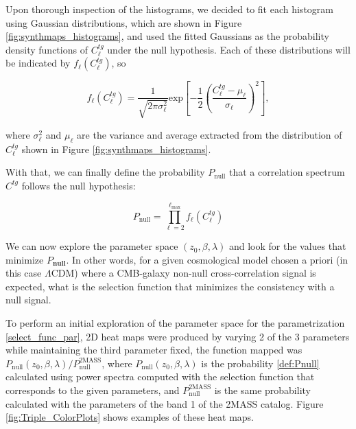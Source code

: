 \documentclass[openany,a4paper,12pt,oneside]{book}
\begin{document}
\begin{spacing}{1.5}
Upon thorough inspection of the histograms, we decided to fit each histogram using Gaussian distributions, which are shown in Figure \ref{fig:synthmaps_histograms}, and used the fitted Gaussians as the probability density functions of $C^{tg}_{\ell}$ under the null hypothesis. Each of these distributions will be indicated by $f_\ell\left(C^{tg}_\ell\right)$, so

\begin{equation}\label{f(ctgl)}
	f_\ell\left(C^{tg}_\ell\right)=\frac{1}{\sqrt{2\pi\sigma_\ell^2}}\text{exp}\left[-\frac{1}{2}\left(\frac{C^{tg}_\ell-\mu_\ell}{\sigma_\ell}\right)^2\right],
\end{equation}

\noindent where $\sigma_\ell^2$ and $\mu_\ell$ are the variance and average extracted from the distribution of $C_\ell^{tg}$ shown in Figure \ref{fig:synthmaps_histograms}.

With that, we can finally define the probability $P_\text{null}$ that a correlation spectrum $C^{tg}$ follows the null hypothesis:

\begin{equation}\label{def:Pnull}
	P_\text{null}=\prod_{\ell=2}^{\ell_\text{max}} f_\ell\left(C^{tg}_\ell\right)
\end{equation}

We can now explore the parameter space $(z_0,\beta,\lambda)$ and look for the values that minimize $P_\textbf{null}$. In other words, for a given cosmological model chosen a priori (in this case $\Lambda$CDM) where a CMB-galaxy non-null cross-correlation signal is expected, what is the selection function that minimizes the consistency with a null signal.

To perform an initial exploration of the parameter space for the parametrization \eqref{select_func_par}, 2D heat maps were produced by varying 2 of the 3 parameters while maintaining the third parameter fixed, the function mapped was $P_\text{null}(z_0, \beta,\lambda)/P_\text{null}^\text{2MASS}$, where $P_\text{null}(z_0, \beta,\lambda)$ is the probability \eqref{def:Pnull} calculated using power spectra computed with the selection function that corresponds to the given parameters, and $P_\text{null}^\text{2MASS}$ is the same probability calculated with the parameters of the band 1 of the 2MASS catalog. Figure \ref{fig:Triple_ColorPlots} shows examples of these heat maps.


\end{spacing}
\end{document}
